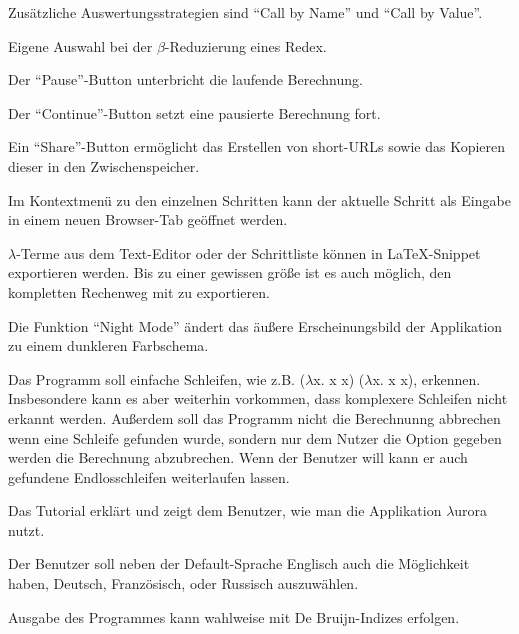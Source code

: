 \documentclass[parskip=full,11pt,twoside]{scrartcl}
\begin{document}
Zusätzliche Auswertungsstrategien sind \enquote{Call by Name} und \enquote{Call by Value}.

Eigene Auswahl bei der $\beta$-Reduzierung eines Redex.

Der \enquote{Pause}-Button unterbricht die laufende Berechnung.

Der \enquote{Continue}-Button setzt eine pausierte Berechnung fort.

Ein \enquote{Share}-Button ermöglicht das Erstellen von short-URLs sowie das Kopieren dieser in den Zwischenspeicher.

Im Kontextmenü zu den einzelnen Schritten kann der aktuelle Schritt als Eingabe in einem neuen Browser-Tab geöffnet werden.

$\lambda$-Terme aus dem Text-Editor oder der Schrittliste können in LaTeX-Snippet exportieren werden. Bis zu einer gewissen größe ist es auch möglich, den kompletten Rechenweg mit zu exportieren.

Die Funktion \enquote{Night Mode} ändert das äußere Erscheinungsbild der Applikation zu einem dunkleren Farbschema.

Das Programm soll einfache Schleifen, wie z.B. ($\lambda$x. x x) ($\lambda$x. x x), erkennen. Insbesondere kann es aber weiterhin vorkommen, dass komplexere Schleifen nicht erkannt werden.
Außerdem soll das Programm nicht die Berechnunng abbrechen wenn eine Schleife gefunden wurde, sondern nur dem Nutzer die Option gegeben werden die Berechnung abzubrechen. Wenn der Benutzer  will kann er auch gefundene Endlosschleifen weiterlaufen lassen.

Das Tutorial erklärt und zeigt dem Benutzer, wie man die Applikation $\lambda$urora nutzt.

Der Benutzer soll neben der Default-Sprache Englisch auch die Möglichkeit haben, Deutsch, Französisch, oder Russisch auszuwählen.

Ausgabe des Programmes kann wahlweise mit De Bruijn-Indizes erfolgen.
\end{document}
